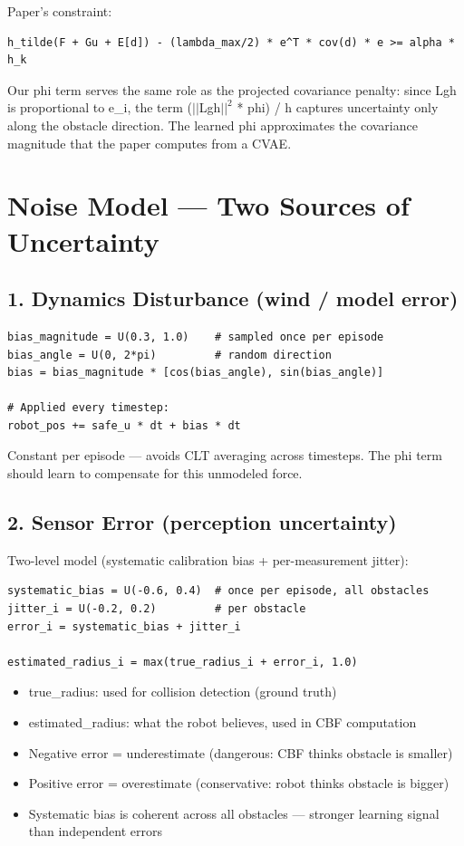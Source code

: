 \documentclass[11pt]{article}
\begin{document}
Paper's constraint:
\begin{verbatim}
h_tilde(F + Gu + E[d]) - (lambda_max/2) * e^T * cov(d) * e >= alpha * h_k
\end{verbatim}

Our phi term serves the same role as the projected covariance penalty: since Lgh is proportional to e\_i, the term ($||$Lgh$||^2$ * phi) / h captures uncertainty only along the obstacle direction. The learned phi approximates the covariance magnitude that the paper computes from a CVAE.


\section*{Noise Model --- Two Sources of Uncertainty}

\subsection*{1. Dynamics Disturbance (wind / model error)}

\begin{verbatim}
bias_magnitude = U(0.3, 1.0)    # sampled once per episode
bias_angle = U(0, 2*pi)         # random direction
bias = bias_magnitude * [cos(bias_angle), sin(bias_angle)]

# Applied every timestep:
robot_pos += safe_u * dt + bias * dt
\end{verbatim}

Constant per episode --- avoids CLT averaging across timesteps. The phi term should learn to compensate for this unmodeled force.


\subsection*{2. Sensor Error (perception uncertainty)}

Two-level model (systematic calibration bias + per-measurement jitter):

\begin{verbatim}
systematic_bias = U(-0.6, 0.4)  # once per episode, all obstacles
jitter_i = U(-0.2, 0.2)         # per obstacle
error_i = systematic_bias + jitter_i

estimated_radius_i = max(true_radius_i + error_i, 1.0)
\end{verbatim}

\begin{itemize}
\item true\_radius: used for collision detection (ground truth)
\item estimated\_radius: what the robot believes, used in CBF computation
\item Negative error = underestimate (dangerous: CBF thinks obstacle is smaller)
\item Positive error = overestimate (conservative: robot thinks obstacle is bigger)
\item Systematic bias is coherent across all obstacles --- stronger learning signal than independent errors
\end{itemize}
\end{document}
